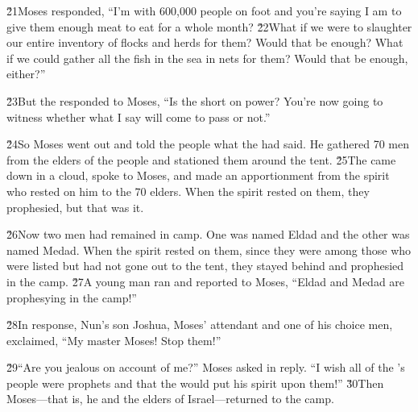 \v{21}Moses responded, ``I'm with 600,000 people on foot and you're saying I am to give them enough meat to eat for a whole month? \v{22}What if we were to slaughter our entire inventory of flocks and herds for them? Would that be enough? What if we could gather all the fish in the sea in nets for them? Would that be enough, either?''

\v{23}But the  responded to Moses, ``Is the  short on power? You're now going to witness whether what I say will come to pass or not.''

\v{24}So Moses went out and told the people what the  had said. He gathered 70 men from the elders of the people and stationed them around the tent. \v{25}The  came down in a cloud, spoke to Moses, and made an apportionment from the spirit who rested on him to the 70 elders. When the spirit rested on them, they prophesied, but that was it.

\v{26}Now two men had remained in camp. One was named Eldad and the other was named Medad. When the spirit rested on them, since they were among those who were listed but had not gone out to the tent, they stayed behind and prophesied in the camp. \v{27}A young man ran and reported to Moses, ``Eldad and Medad are prophesying in the camp!''

\v{28}In response, Nun's son Joshua, Moses' attendant and one of his choice men, exclaimed, ``My master Moses! Stop them!''

\v{29}``Are you jealous on account of me?'' Moses asked in reply. ``I wish all of the 's people were prophets and that the  would put his spirit upon them!'' \v{30}Then Moses---that is, he and the elders of Israel---returned to the camp.

